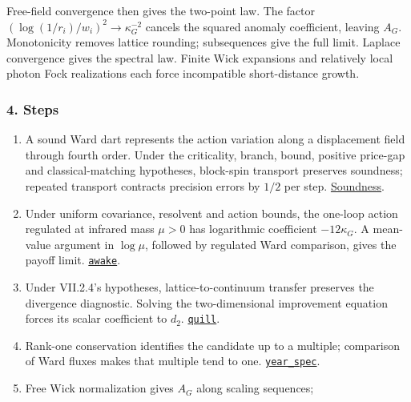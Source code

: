 \documentclass[
  letterpaper,
  11pt]{article}
\begin{document}
Free-field convergence then gives the two-point law. The factor
\((\log(1/r_i)/w_i)^2\to\kappa_G^{-2}\) cancels the squared anomaly
coefficient, leaving \(A_G\). Monotonicity removes lattice rounding;
subsequences give the full limit. Laplace convergence gives the spectral
law. Finite Wick expansions and relatively local photon Fock
realizations each force incompatible short-distance growth.

\subsubsection{4. Steps}\label{steps-26}

\begin{enumerate}
\def\labelenumi{\arabic{enumi}.}
\item
  A sound Ward dart represents the action variation along a displacement
  field through fourth order. Under the criticality, branch, bound,
  positive price-gap and classical-matching hypotheses, block-spin
  transport preserves soundness; repeated transport contracts precision
  errors by \(1/2\) per step.
  \href{https://github.com/yang-mills-group/OpenAI-YM-20261028/blob/3456e5e75cf8d4cd558955a5c7638fba2d68f464/YM/TraceExtension/Perfect/Badge.lean\#L110-L141}{Soundness}.
\item
  Under uniform covariance, resolvent and action bounds, the one-loop
  action regulated at infrared mass \(\mu>0\) has logarithmic
  coefficient \(-12\kappa_G\). A mean-value argument in \(\log\mu\),
  followed by regulated Ward comparison, gives the payoff limit.
  \href{https://github.com/yang-mills-group/OpenAI-YM-20261028/blob/3456e5e75cf8d4cd558955a5c7638fba2d68f464/YM/TraceExtension/Loft/Awake.lean\#L32-L53}{\texttt{awake}}.
\item
  Under VII.2.4's hypotheses, lattice-to-continuum transfer preserves
  the divergence diagnostic. Solving the two-dimensional improvement
  equation forces its scalar coefficient to \(d_2\).
  \href{https://github.com/yang-mills-group/OpenAI-YM-20261028/blob/3456e5e75cf8d4cd558955a5c7638fba2d68f464/YM/TraceExtension/Chart/Limits.lean\#L68-L80}{\texttt{quill}}.
\item
  Rank-one conservation identifies the candidate up to a multiple;
  comparison of Ward fluxes makes that multiple tend to one.
  \href{https://github.com/yang-mills-group/OpenAI-YM-20261028/blob/3456e5e75cf8d4cd558955a5c7638fba2d68f464/YM/TraceExtension/Chart/North.lean\#L28-L65}{\texttt{year\_spec}}.
\item
  Free Wick normalization gives \(A_G\) along scaling sequences;

\end{enumerate}
\end{document}
